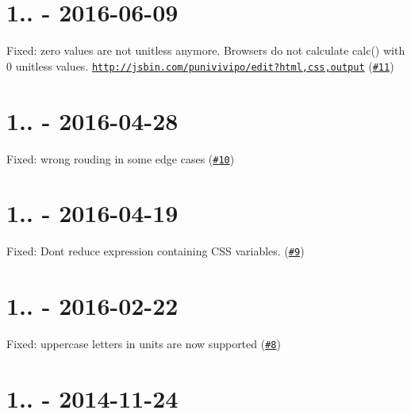 \section*{1.. -\/ 2016-\/06-\/09}


\begin{DoxyItemize}
\item Fixed\+: zero values are not unitless anymore. Browsers do not calculate calc() with 0 unitless values. \href{http://jsbin.com/punivivipo/edit?html,css,output}{\tt http\+://jsbin.\+com/punivivipo/edit?html,css,output} (\href{https://github.com/MoOx/reduce-css-calc/pull/11}{\tt \#11}) 
\end{DoxyItemize}

\section*{1.. -\/ 2016-\/04-\/28}


\begin{DoxyItemize}
\item Fixed\+: wrong rouding in some edge cases (\href{https://github.com/MoOx/reduce-css-calc/pull/10}{\tt \#10})
\end{DoxyItemize}

\section*{1.. -\/ 2016-\/04-\/19}


\begin{DoxyItemize}
\item Fixed\+: Don\textquotesingle{}t reduce expression containing C\+SS variables. (\href{https://github.com/MoOx/reduce-css-calc/pull/9}{\tt \#9})
\end{DoxyItemize}

\section*{1.. -\/ 2016-\/02-\/22}


\begin{DoxyItemize}
\item Fixed\+: uppercase letters in units are now supported (\href{https://github.com/MoOx/reduce-css-calc/pull/8}{\tt \#8})
\end{DoxyItemize}

\section*{1.. -\/ 2014-\/11-\/24}


